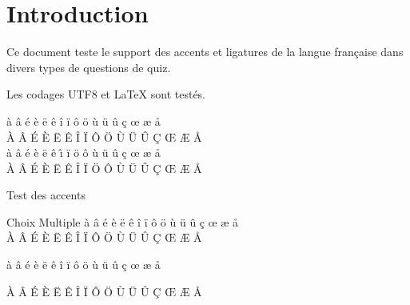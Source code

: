 \documentclass{article}
\begin{document}
\section*{Introduction}

Ce document teste le support des accents et ligatures de la langue française 
dans divers types de questions de quiz.

Les codages UTF8 et \LaTeX{} sont testés.

à   â   é   è   ë   ê   î      ï   ô   ö   ù   ü   û   ç     œ   æ   å\\
À   Â   É   È   Ë   Ê   Î      Ï   Ô   Ö   Ù   Ü   Û   Ç     Œ   Æ   Å\\
\`a \^a \'e \`e \"e \^e \^{\i} \"i \"o \^o \`u \"u \^u \c{c} \oe{} \ae{} \aa{}\\
\`A \^A \'E \`E \"E \^E \^I    \"I \"O \^O \`U \"U \^U \c{C} \OE{} \AE{} \AA{}\\
\begin{quiz}{Test des accents}

\begin{multi}{Choix Multiple}
à   â   é   è   ë   ê   î      ï   ô   ö   ù   ü   û   ç     œ   æ   å\\
À   Â   É   È   Ë   Ê   Î      Ï   Ô   Ö   Ù   Ü   Û   Ç     Œ   Æ   Å\\
\item[] à   â   é   è   ë   ê   î      ï   ô   ö   ù   ü   û   ç     œ   æ   å
\item* À   Â   É   È   Ë   Ê   Î      Ï   Ô   Ö   Ù   Ü   Û   Ç     Œ   Æ   Å
\end{multi}

\end{quiz}
\end{document}
